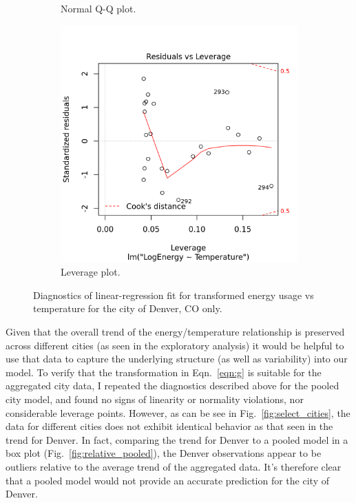 \documentclass[11pt]{article}
\begin{document}
\begin{figure}[ht]
\begin{subfigure}{0.32\textwidth}
    \caption{Normal Q-Q plot.}
    \label{fig:denver_qq}
  \end{subfigure}%
  \hfill
  \begin{subfigure}{0.32\textwidth}
    \includegraphics[width=\textwidth]{denver_diagnostic004.png}
    \caption{Leverage plot.}
    \label{fig:denver_leverage}
  \end{subfigure}%
  \caption{Diagnostics of linear-regression fit for transformed energy usage vs temperature for the city of Denver, CO only.}
\end{figure}

Given that the overall trend of the energy/temperature relationship is preserved across different cities (as seen in the exploratory analysis) it would be helpful to use that data to capture the underlying structure (as well as variability) into our model. To verify that the transformation in Eqn.~\ref{eqn:g} is suitable for the aggregated city data, I repeated the diagnostics described above for the pooled city model, and found no signs of linearity or normality violations, nor considerable leverage points. However, as can be see in Fig.~\ref{fig:select_cities}, the data for different cities does not exhibit identical behavior as that seen in the trend for Denver. In fact, comparing the trend for Denver to a pooled model in a box plot (Fig.~\ref{fig:relative_pooled}), the Denver observations appear to be outliers relative to the average trend of the aggregated data. It's therefore clear that a pooled model would not provide an accurate prediction for the city of Denver.
\end{document}
